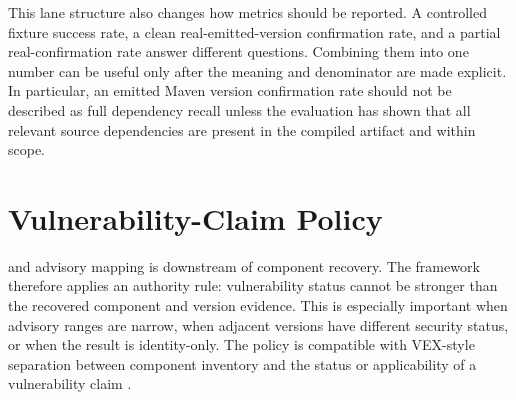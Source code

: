 This lane structure also changes how metrics should be reported. A controlled
fixture success rate, a clean real-\APK emitted-version confirmation rate, and
a partial real-\APK confirmation rate answer different questions. Combining
them into one number can be useful only after the meaning and denominator are
made explicit. In particular, an emitted Maven version confirmation rate
should not be described as full dependency recall unless the evaluation has
shown that all relevant source dependencies are present in the compiled
artifact and within scope.

\section{Vulnerability-Claim Policy}

\CVE and advisory mapping is downstream of component recovery. The framework
therefore applies an authority rule: vulnerability status cannot be stronger
than the recovered component and version evidence. This is especially
important when advisory ranges are narrow, when adjacent versions have
different security status, or when the result is identity-only. The policy is
compatible with VEX-style separation between component inventory and the
status or applicability of a vulnerability claim \cite{cyclonedxVex}.

